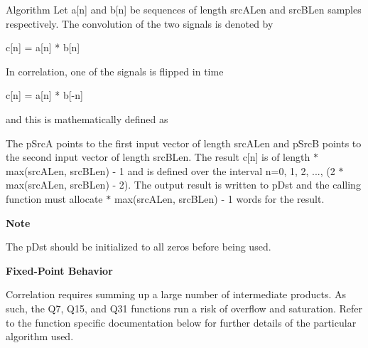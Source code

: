 \begin{DoxyParagraph}{Algorithm }
Let {\ttfamily a\mbox{[}n\mbox{]}} and {\ttfamily b\mbox{[}n\mbox{]}} be sequences of length {\ttfamily src\-A\-Len} and {\ttfamily src\-B\-Len} samples respectively. The convolution of the two signals is denoted by 
\begin{DoxyPre}   
                  c[n] = a[n] * b[n]   
\end{DoxyPre}
 In correlation, one of the signals is flipped in time 
\begin{DoxyPre}   
                  c[n] = a[n] * b[-n]   
\end{DoxyPre}

\end{DoxyParagraph}
\begin{DoxyParagraph}{}
and this is mathematically defined as  
\end{DoxyParagraph}
\begin{DoxyParagraph}{}
The {\ttfamily p\-Src\-A} points to the first input vector of length {\ttfamily src\-A\-Len} and {\ttfamily p\-Src\-B} points to the second input vector of length {\ttfamily src\-B\-Len}. The result {\ttfamily c\mbox{[}n\mbox{]}} is of length { $\ast$ max(src\-A\-Len, src\-B\-Len) -\/ 1} and is defined over the interval {\ttfamily n=0, 1, 2, ..., (2 $\ast$ max(src\-A\-Len, src\-B\-Len) -\/ 2)}. The output result is written to {\ttfamily p\-Dst} and the calling function must allocate { $\ast$ max(src\-A\-Len, src\-B\-Len) -\/ 1} words for the result.
\end{DoxyParagraph}
{\bfseries Note} \begin{DoxyParagraph}{}
The {\ttfamily p\-Dst} should be initialized to all zeros before being used.
\end{DoxyParagraph}
{\bfseries Fixed-\/\-Point Behavior} \begin{DoxyParagraph}{}
Correlation requires summing up a large number of intermediate products. As such, the Q7, Q15, and Q31 functions run a risk of overflow and saturation. Refer to the function specific documentation below for further details of the particular algorithm used. 
\end{DoxyParagraph}


